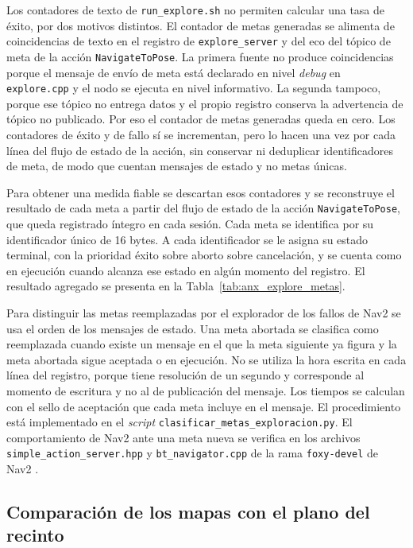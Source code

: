 \begin{appendices}
Los contadores de texto de \texttt{run\_explore.sh} no permiten calcular una tasa de éxito, por dos motivos distintos. El contador de metas generadas se alimenta de coincidencias de texto en el registro de \texttt{explore\_server} y del eco del tópico de meta de la acción \texttt{NavigateToPose}. La primera fuente no produce coincidencias porque el mensaje de envío de meta está declarado en nivel \textit{debug} en \texttt{explore.cpp} y el nodo se ejecuta en nivel informativo. La segunda tampoco, porque ese tópico no entrega datos y el propio registro conserva la advertencia de tópico no publicado. Por eso el contador de metas generadas queda en cero. Los contadores de éxito y de fallo sí se incrementan, pero lo hacen una vez por cada línea del flujo de estado de la acción, sin conservar ni deduplicar identificadores de meta, de modo que cuentan mensajes de estado y no metas únicas.

Para obtener una medida fiable se descartan esos contadores y se reconstruye el resultado de cada meta a partir del flujo de estado de la acción \texttt{NavigateToPose}, que queda registrado íntegro en cada sesión. Cada meta se identifica por su identificador único de 16 bytes. A cada identificador se le asigna su estado terminal, con la prioridad éxito sobre aborto sobre cancelación, y se cuenta como en ejecución cuando alcanza ese estado en algún momento del registro. El resultado agregado se presenta en la Tabla~\ref{tab:anx_explore_metas}.

Para distinguir las metas reemplazadas por el explorador de los fallos de Nav2
se usa el orden de los mensajes de estado. Una meta abortada se clasifica como
reemplazada cuando existe un mensaje en el que la meta siguiente ya figura y
la meta abortada sigue aceptada o en ejecución. No se utiliza la hora escrita
en cada línea del registro, porque tiene resolución de un segundo y corresponde
al momento de escritura y no al de publicación del mensaje. Los tiempos se
calculan con el sello de aceptación que cada meta incluye en el mensaje. El
procedimiento está implementado en el \textit{script}
\texttt{clasificar\_metas\_exploracion.py}. El comportamiento de Nav2 ante una
meta nueva se verifica en los archivos \texttt{simple\_action\_server.hpp} y
\texttt{bt\_navigator.cpp} de la rama \texttt{foxy-devel} de Nav2
\citep{nav2_foxy_src}.

\subsection{Comparación de los mapas con el plano del recinto}
\label{anx:comparacion_plano}


\end{appendices}
